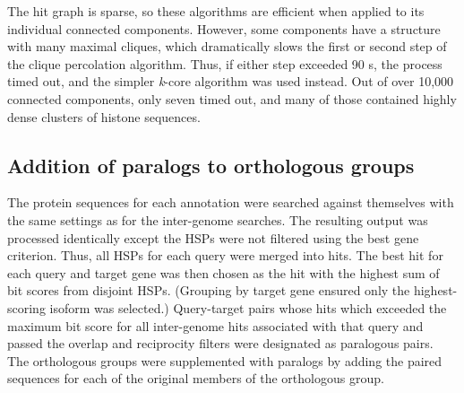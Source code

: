 The hit graph is sparse, so these algorithms are efficient when applied to its individual connected components. However, some components have a structure with many maximal cliques, which dramatically slows the first or second step of the clique percolation algorithm. Thus, if either step exceeded 90 s, the process timed out, and the simpler \textit{k}-core algorithm was used instead. Out of over 10,000 connected components, only seven timed out, and many of those contained highly dense clusters of histone sequences.

\subsection*{Addition of paralogs to orthologous groups}
The protein sequences for each annotation were searched against themselves with the same settings as for the inter-genome searches. The resulting output was processed identically except the HSPs were not filtered using the best gene criterion. Thus, all HSPs for each query were merged into hits. The best hit for each query and target gene was then chosen as the hit with the highest sum of bit scores from disjoint HSPs. (Grouping by target gene ensured only the highest-scoring isoform was selected.) Query-target pairs whose hits which exceeded the maximum bit score for all inter-genome hits associated with that query and passed the overlap and reciprocity filters were designated as paralogous pairs. The orthologous groups were supplemented with paralogs by adding the paired sequences for each of the original members of the orthologous group.


